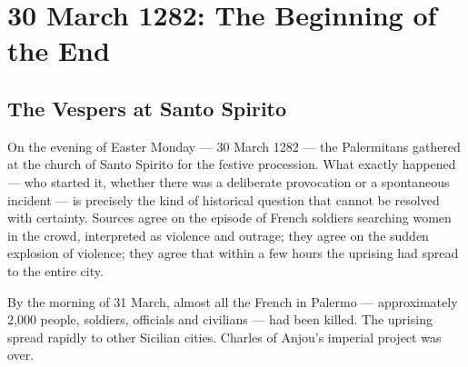 \secsep

\section{30 March 1282: The Beginning of the End}

\subsection{The Vespers at Santo Spirito}

On the evening of Easter Monday — 30 March 1282 — the Palermitans
gathered at the church of Santo Spirito for the festive procession.
What exactly happened — who started it, whether there was a deliberate
provocation or a spontaneous incident — is precisely the kind of historical
question that cannot be resolved with certainty. Sources agree on the
episode of French soldiers searching women in the crowd, interpreted as
violence and outrage; they agree on the sudden explosion of violence;
they agree that within a few hours the uprising had spread to the entire
city.


By the morning of 31 March, almost all the French in Palermo —
approximately 2,000 people, soldiers, officials and civilians — had been
killed. The uprising spread rapidly to other Sicilian cities.
Charles of Anjou's imperial project was over.

